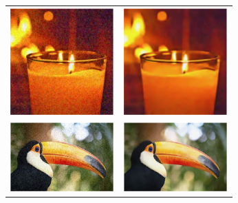 \documentclass[a4paper]{article}
\begin{document}
\begin{center}
\begin{tabular}{c c}
\includegraphics[width=4cm]{./figures/candle_noise.eps} & \includegraphics[width=4cm]{./figures/candle_clean.eps}\\
\includegraphics[width=4cm]{./figures/bird_noise.eps} & \includegraphics[width=4cm]{./figures/bird_clean.eps}\\
\end{tabular}
\end{center}
\end{document}
